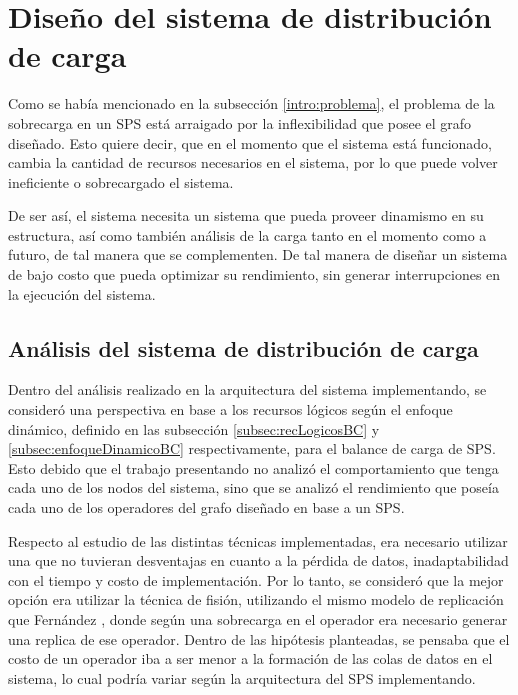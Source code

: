 \chapter{Dise\~no del sistema de distribución de carga}
\label{cap:disenoSistema}

Como se había mencionado en la subsección \ref{intro:problema}, el problema de la sobrecarga en un SPS está arraigado por la inflexibilidad que posee el grafo diseñado. Esto quiere decir, que en el momento que el sistema está funcionado, cambia la cantidad de recursos necesarios en el sistema, por lo que puede volver ineficiente o sobrecargado el sistema.

De ser así, el sistema necesita un sistema que pueda proveer dinamismo en su estructura, así como también análisis de la carga tanto en el momento como a futuro, de tal manera que se complementen. De tal manera de diseñar un sistema de bajo costo que pueda optimizar su rendimiento, sin generar interrupciones en la ejecución del sistema.

\section{Análisis del sistema de distribución de carga}
Dentro del análisis realizado en la arquitectura del sistema implementando, se consideró una perspectiva en base a los recursos lógicos según el enfoque dinámico, definido en las subsección \ref{subsec:recLogicosBC} y \ref{subsec:enfoqueDinamicoBC} respectivamente, para el balance de carga de SPS. Esto debido que el trabajo presentando no analizó el comportamiento que tenga cada uno de los nodos del sistema, sino que se analizó el rendimiento que poseía cada uno de los operadores del grafo diseñado en base a un SPS.

Respecto al estudio de las distintas técnicas implementadas, era necesario utilizar una que no tuvieran desventajas en cuanto a la pérdida de datos, inadaptabilidad con el tiempo y costo de implementación. Por lo tanto, se consideró que la mejor opción era utilizar la técnica de fisión, utilizando el mismo modelo de replicación que Fernández \citep{FernandezMKP13}, donde según una sobrecarga en el operador era necesario generar una replica de ese operador. Dentro de las hipótesis planteadas, se pensaba que el costo de un operador iba a ser menor a la formación de las colas de datos en el sistema, lo cual podría variar según la arquitectura del SPS implementando.

